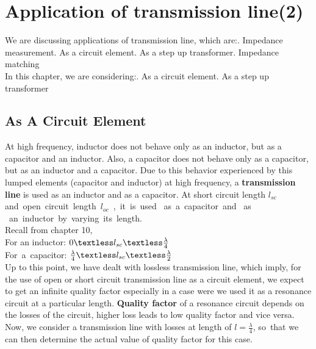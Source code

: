 \chapter{Application of transmission line(2)}
	We are discussing applications of transmission line, which are:. Impedance measurement. As a circuit element. As a step up transformer. Impedance matching \\
	
	In this chapter, we are considering:. As a circuit element. As a step up transformer
	
	\section{As A Circuit Element}
	At high frequency, inductor does not behave only as an inductor, but as a capacitor and an inductor. Also, a capacitor does not behave only as a capacitor, but as an inductor and a capacitor. Due to this behavior experienced by this lumped elements (capacitor and inductor) at high frequency, a \textbf{transmission line} is used as an inductor and as a capacitor.
	At short circuit length $l_{sc}$ and\ open\ circuit\ length\ $l_{oc}$\ ,\ it\ is\ used \ as\ a\ capacitor\ and \ as \ an\ inductor\ by\ varying\ its\ length.\\
	Recall from chapter 10,\\
	For an inductor: $0 \textless l_{sc} \textless 
	\frac{\lambda}{\small 4}$\\
	For\ a\ capacitor: $\frac{\lambda}{4} \textless l_{sc} \textless \frac{\lambda}{2} $\\
	
	
	Up to this point, we have dealt with lossless transmission line, which imply, for the use of open or short circuit transmission line as a circuit element, we expect to get an infinite quality factor especially in a case were we used it as a resonance circuit at a particular length. \textbf{Quality factor} of a resonance circuit depends on the losses of the circuit, higher loss leads to low quality factor and vice versa.\\
	
	Now, we consider a transmission line with losses at length of $ l=\frac{\lambda}{4} $, so\ that we can then determine the actual value of quality factor for this case.\\
	
